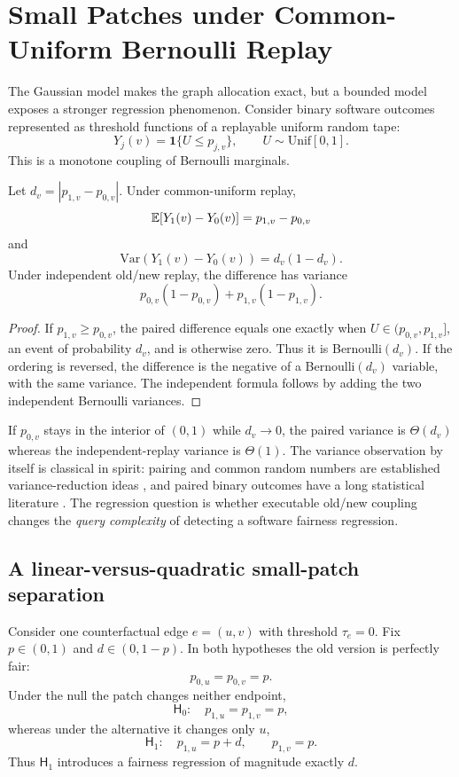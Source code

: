 \section{Small Patches under Common-Uniform Bernoulli Replay}
\label{sec:bernoulli}

The Gaussian model makes the graph allocation exact, but a bounded model exposes
a stronger regression phenomenon.  Consider binary software outcomes represented
as threshold functions of a replayable uniform random tape:
\[
Y_j(v)=\mathbf 1\{U\le p_{j,v}\},
\qquad U\sim\mathrm{Unif}[0,1].
\]
This is a monotone coupling of Bernoulli marginals.

\begin{proposition}
\label{prop:bernoulli}
Let $d_v=|p_{1,v}-p_{0,v}|$.  Under common-uniform replay,
\[
\mathbb{E}[Y_1(v)-Y_0(v)]=p_{1,v}-p_{0,v}
\]
and
\[
\mathrm{Var}(Y_1(v)-Y_0(v))=d_v(1-d_v).
\]
Under independent old/new replay, the difference has variance
\[
p_{0,v}(1-p_{0,v})+p_{1,v}(1-p_{1,v}).
\]
\end{proposition}

\begin{proof}
If $p_{1,v}\ge p_{0,v}$, the paired difference equals one exactly when
$U\in(p_{0,v},p_{1,v}]$, an event of probability $d_v$, and is otherwise zero.
Thus it is Bernoulli$(d_v)$.  If the ordering is reversed, the difference is the
negative of a Bernoulli$(d_v)$ variable, with the same variance.  The independent
formula follows by adding the two independent Bernoulli variances.
\end{proof}

If $p_{0,v}$ stays in the interior of $(0,1)$ while $d_v\to0$, the paired variance
is $\Theta(d_v)$ whereas the independent-replay variance is $\Theta(1)$.  The
variance observation by itself is classical in spirit: pairing and common random
numbers are established variance-reduction ideas \cite{GlassermanYao1992}, and
paired binary outcomes have a long statistical literature \cite{Connor1987}.
The regression question is whether executable old/new coupling changes the
\emph{query complexity} of detecting a software fairness regression.

\subsection{A linear-versus-quadratic small-patch separation}

Consider one counterfactual edge $e=(u,v)$ with threshold $\tau_e=0$.  Fix
$p\in(0,1)$ and $d\in(0,1-p)$.  In both hypotheses the old version is perfectly
fair:
\[
p_{0,u}=p_{0,v}=p.
\]
Under the null the patch changes neither endpoint,
\[
\mathsf H_0:
\quad
p_{1,u}=p_{1,v}=p,
\]
whereas under the alternative it changes only $u$,
\[
\mathsf H_1:
\quad
p_{1,u}=p+d,
\qquad
p_{1,v}=p.
\]
Thus $\mathsf H_1$ introduces a fairness regression of magnitude exactly $d$.

